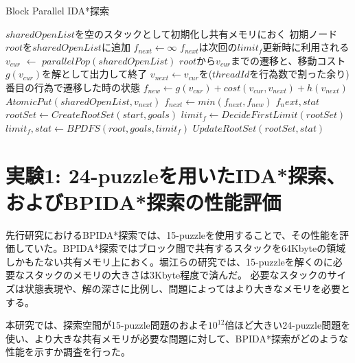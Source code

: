 \documentclass[a4paper,11pt,oneside,openany]{jsbook}
\begin{document}
\newpage
\begin{algorithm}[H]
\caption{Block Parallel IDA*探索}
\label{alg:pbnf}
\begin{algorithmic}[1]
    \State $sharedOpenList$を空のスタックとして初期化し共有メモリにおく
    \State 初期ノード$root$を$sharedOpenList$に追加
    \State $f_{next} \leftarrow \infty$
    \State $f_{next}$は次回の$limit_f$更新時に利用される 
        \State $v_{cur}$ $\leftarrow$ ${parallelPop}(sharedOpenList)$
            \State $root$から$v_{cur}$までの遷移と、移動コスト$g(v_{cur})$を解として出力して終了
        \EndIf
        \State $v_{next} \gets $$v_{cur}$を($threadId$を行為数で割った余り)番目の行為で遷移した時の状態
        \State $f_{new} \leftarrow g(v_{cur}) + cost(v_{cur}, v_{next}) + h(v_{next})$
            \State ${AtomicPut}(sharedOpenList, v_{next})$ 
        \Else
            \State $f_{next} \leftarrow min(f_{next}, f_{new})$
        \EndIf
    \EndWhile
    \State \Return $f_next, stat$
\EndFunction
{}
    \State $rootSet \gets {CreateRootSet}(start, goals)$
    \State $limit_f \leftarrow {DecideFirstLimit}(rootSet)$
            \State $limit_f, stat \gets {BPDFS}(root, goals, limit_f)$
        \EndParallelForByBlocks
        \State $UpdateRootSet(rootSet, stat)$
    \EndWhile
\EndFunction

\end{algorithmic}
\end{algorithm}
\newpage

\section{実験1: 24-puzzleを用いたIDA*探索、およびBPIDA*探索の性能評価}
先行研究におけるBPIDA*探索\cite{HA17}では、15-puzzleを使用することで、その性能を評価していた。BPIDA*探索ではブロック間で共有するスタックを64Kbyteの領域しかもたない共有メモリ上におく。堀江らの研究では、15-puzzleを解くのに必要なスタックのメモリの大きさは3Kbyte程度で済んだ。
必要なスタックのサイズは状態表現や、解の深さに比例し、問題によってはより大きなメモリを必要とする。

本研究では、探索空間が15-puzzle問題のおよそ$10^{12}$倍ほど大きい24-puzzle問題を使い、より大きな共有メモリが必要な問題に対して、BPIDA*探索がどのような性能を示すか調査を行った。
\end{document}
